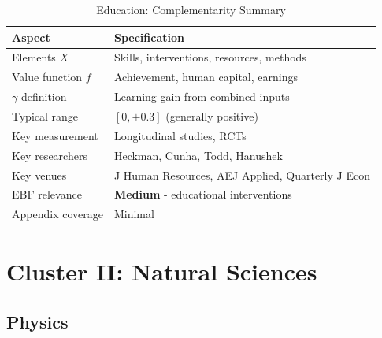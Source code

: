 \begin{table}[h]
\centering
\caption{Education: Complementarity Summary}
\label{tab:edu-summary}
\renewcommand{\arraystretch}{1.3}
\small
\begin{tabular}{@{}ll@{}}
\toprule
\textbf{Aspect} & \textbf{Specification} \\
\midrule
Elements $X$ & Skills, interventions, resources, methods \\
Value function $f$ & Achievement, human capital, earnings \\
$\gamma$ definition & Learning gain from combined inputs \\
Typical range & $[0, +0.3]$ (generally positive) \\
Key measurement & Longitudinal studies, RCTs \\
Key researchers & Heckman, Cunha, Todd, Hanushek \\
Key venues & J Human Resources, AEJ Applied, Quarterly J Econ \\
EBF relevance & \textbf{Medium} - educational interventions \\
Appendix coverage & Minimal \\
\bottomrule
\end{tabular}
\end{table}

\section{Cluster II: Natural Sciences}
\label{sec:natural}

\subsection{Physics}
\label{sec:physics}

